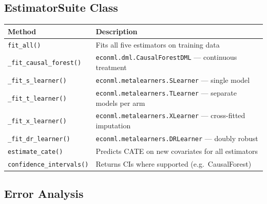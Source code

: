 \documentclass[11pt, letterpaper]{article}
\begin{document}
\subsection{EstimatorSuite Class}

\begin{center}
\begin{tabularx}{\textwidth}{l X}
    \toprule
    \textbf{Method} & \textbf{Description} \\
    \midrule
    \texttt{fit\_all()}            & Fits all five estimators on training data \\
    \texttt{\_fit\_causal\_forest()} & \texttt{econml.dml.CausalForestDML} --- continuous treatment \\
    \texttt{\_fit\_s\_learner()}     & \texttt{econml.metalearners.SLearner} --- single model \\
    \texttt{\_fit\_t\_learner()}     & \texttt{econml.metalearners.TLearner} --- separate models per arm \\
    \texttt{\_fit\_x\_learner()}     & \texttt{econml.metalearners.XLearner} --- cross-fitted imputation \\
    \texttt{\_fit\_dr\_learner()}    & \texttt{econml.metalearners.DRLearner} --- doubly robust \\
    \texttt{estimate\_cate()}      & Predicts CATE on new covariates for all estimators \\
    \texttt{confidence\_intervals()} & Returns CIs where supported (e.g.\ CausalForest) \\
    \bottomrule
\end{tabularx}
\end{center}

\subsection{Error Analysis}
\end{document}
